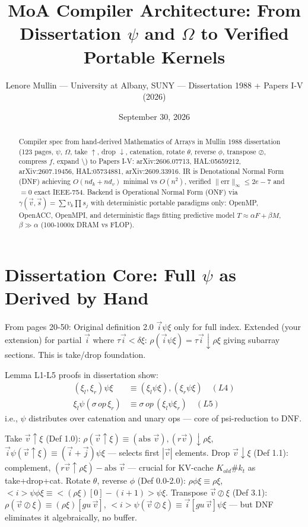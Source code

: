 \documentclass[11pt,a4paper]{article}
\title{MoA Compiler Architecture: From Dissertation $\psi$ and $\Omega$ to Verified Portable Kernels}
\author{Lenore Mullin — University at Albany, SUNY — Dissertation 1988 + Papers I-V (2026)}
\date{September 30, 2026}
\begin{document}
\maketitle

\begin{abstract}
Compiler spec from hand-derived Mathematics of Arrays in Mullin 1988 dissertation (123 pages, $\psi$, $\Omega$, take $\uparrow$, drop $\downarrow$, catenation, rotate $\theta$, reverse $\phi$, transpose $\oslash$, compress $f$, expand $\setminus$) to Papers I-V: arXiv:2606.07713, HAL:05659212, arXiv:2607.19456, HAL:05734881, arXiv:2609.33916. IR is Denotational Normal Form (DNF) achieving $O(nd_k+nd_v)$ minimal vs $O(n^2)$, verified $\|\text{err}\|_\infty\le2e-7$ and $=0$ exact IEEE-754. Backend is Operational Normal Form (ONF) via $\gamma(\vec v,\vec s)=\sum v_k\prod s_j$ with deterministic portable paradigms only: OpenMP, OpenACC, OpenMPI, and deterministic flags fitting predictive model $T\approx\alpha F+\beta M$, $\beta\gg\alpha$ (100-1000x DRAM vs FLOP).
\end{abstract}

\section{Dissertation Core: Full $\psi$ as Derived by Hand}

From pages 20-50: Original definition 2.0 $\vec i\psi\xi$ only for full index. Extended (your extension) for partial $\vec i$ where $\tau\vec i<\delta\xi$: $\rho(\vec i\psi\xi)=\tau\vec i\downarrow\rho\xi$ giving subarray sections. This is take/drop foundation.

Lemma L1-L5 proofs in dissertation show:
\begin{align*}
(\xi_l,\xi_r)\psi\xi &\equiv (\xi_l\psi\xi),(\xi_r\psi\xi) \quad (L4)\\
\xi_l\psi(\sigma\,op\,\xi_r) &\equiv \sigma\,op\,(\xi_l\psi\xi_r) \quad (L5)
\end{align*}
i.e., $\psi$ distributes over catenation and unary ops — core of psi-reduction to DNF.

Take $\vec v\uparrow\xi$ (Def 1.0): $\rho(\vec v\uparrow\xi)\equiv(\text{abs }\vec v),(r\vec v)\downarrow\rho\xi$, $\vec i\psi(\vec v\uparrow\xi)\equiv(\vec i+\vec j)\psi\xi$ — selects first $|\vec v|$ elements.
Drop $\vec v\downarrow\xi$ (Def 1.1): complement, $(r\vec v\uparrow\rho\xi)-\text{abs }\vec v$ — crucial for KV-cache $K_{old}\#k_t$ as take+drop+cat.
Rotate $\theta$, reverse $\phi$ (Def 0.0-2.0): $\rho\phi\xi\equiv\rho\xi$, $<i>\psi\phi\xi\equiv<(\rho\xi)[0]-(i+1)>\psi\xi$.
Transpose $\vec v\oslash\xi$ (Def 3.1): $\rho(\vec v\oslash\xi)\equiv(\rho\xi)[gu\,\vec v]$, $<i>\psi(\vec v\oslash\xi)\equiv\vec i[gu\,\vec v]\psi\xi$ — but DNF eliminates it algebraically, no buffer.
\end{document}
